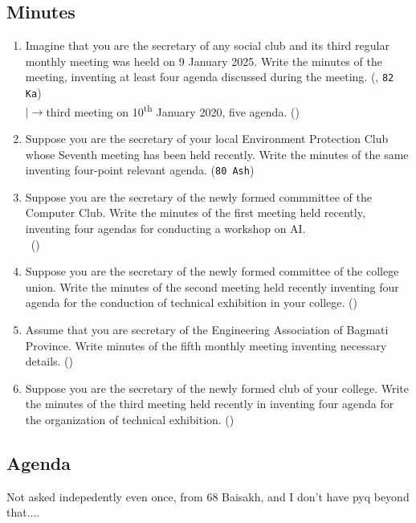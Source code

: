 \documentclass[12pt]{article}
\newcommand{\lb}{\\$\left|\rightarrow\right.$}
\newcommand{\enter}{\\\textcolor{white}{1}}
\newcommand{\super}[1]{\textsuperscript{#1}}
\begin{document}
  \subsection{Minutes}
    \begin{enumerate}
      \item Imagine that you are the secretary of any social club and its third regular monthly meeting was heeld on 9 January 2025. Write the minutes of the meeting, inventing at least four agenda discussed during the meeting. \hfill (, \texttt{82 Ka})
        \lb third meeting on 10\super{th} January 2020, five agenda. \hfill ()

      \item Suppose you are the secretary of your local Environment Protection Club whose Seventh meeting has been held recently. Write the minutes of the same inventing four-point relevant agenda. \hfill (\texttt{80 Ash})

      \item Suppose you are the secretary of the newly formed commmittee of the Computer Club. Write the minutes of the first meeting held recently, inventing four agendas for conducting a workshop on AI.
        \enter\hfill ()

      \item Suppose you are the secretary of the newly formed committee of the college union. Write the minutes of the second meeting held recently inventing four agenda for the conduction of technical exhibition in your college. \hfill ()

      \item Assume that you are secretary of the Engineering Association of Bagmati Province. Write minutes of the fifth monthly meeting inventing necessary details. \hfill ()

      \item Suppose you are the secretary of the newly formed club of your college. Write the minutes of the third meeting held recently in inventing four agenda for the organization of technical exhibition. \hfill ()
    \end{enumerate}

  \subsection{Agenda}
    Not asked indepedently even once, from 68 Baisakh, and I don't have pyq beyond that....
\pagebreak
\end{document}

